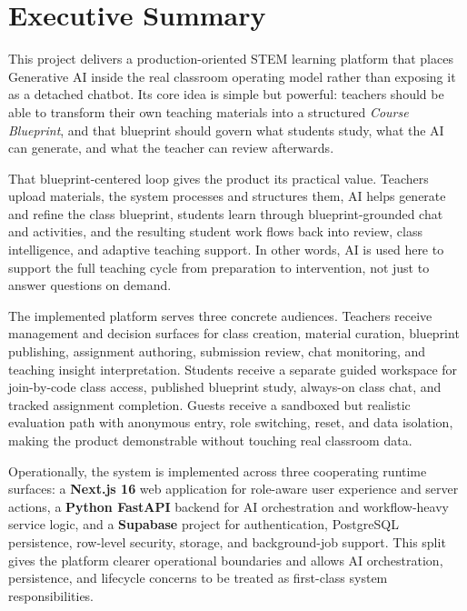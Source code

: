 \documentclass[11pt,a4paper]{article}
\begin{document}
\clearpage
\hypersetup{pageanchor=true}
\tableofcontents
\newpage
\raggedright

\section{Executive Summary}

This project delivers a production-oriented STEM learning platform that places Generative AI inside
the real classroom operating model rather than exposing it as a detached chatbot. Its core idea is
simple but powerful: teachers should be able to transform their own teaching materials into a
structured \emph{Course Blueprint}, and that blueprint should govern what students study, what the
AI can generate, and what the teacher can review afterwards.

That blueprint-centered loop gives the product its practical value. Teachers upload materials, the
system processes and structures them, AI helps generate and refine the class blueprint, students
learn through blueprint-grounded chat and activities, and the resulting student work flows back into
review, class intelligence, and adaptive teaching support. In other words, AI is used here to
support the full teaching cycle from preparation to intervention, not just to answer questions on
demand.

The implemented platform serves three concrete audiences. Teachers receive management and decision
surfaces for class creation, material curation, blueprint publishing, assignment authoring,
submission review, chat monitoring, and teaching insight interpretation. Students receive a separate
guided workspace for join-by-code class access, published blueprint study, always-on class chat, and
tracked assignment completion. Guests receive a sandboxed but realistic evaluation path with
anonymous entry, role switching, reset, and data isolation, making the product demonstrable without
touching real classroom data.

Operationally, the system is implemented across three cooperating runtime surfaces: a \textbf{Next.js
16} web application for role-aware user experience and server actions, a \textbf{Python FastAPI}
backend for AI orchestration and workflow-heavy service logic, and a \textbf{Supabase} project for
authentication, PostgreSQL persistence, row-level security, storage, and background-job support.
This split gives the platform clearer operational boundaries and allows AI orchestration,
persistence, and lifecycle concerns to be treated as first-class system responsibilities.
\end{document}
